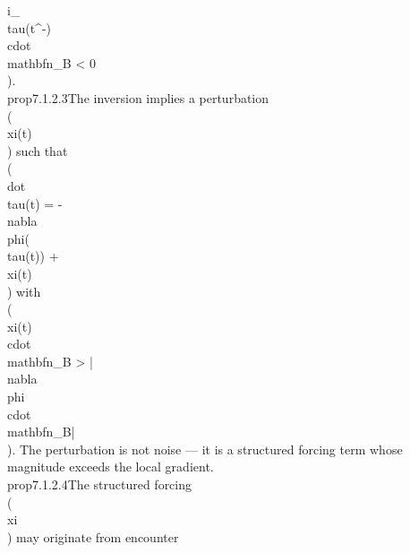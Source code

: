 {{{{{i_\\tau(t^-) \\cdot \\mathbf{n}_B < 0\\).}\n\n\\prop{7.1.2.3}{The inversion implies a perturbation \\(\\xi(t)\\) such that \\(\\dot{\\tau}(t) = -\\nabla\\phi(\\tau(t)) + \\xi(t)\\) with \\(\\xi(t) \\cdot \\mathbf{n}_B > |\\nabla\\phi \\cdot \\mathbf{n}_B|\\). The perturbation is not noise — it is a structured forcing term whose magnitude exceeds the local gradient.}\n\n\\prop{7.1.2.4}{The structured forcing \\(\\xi\\) may originate from encounter }}}}}
